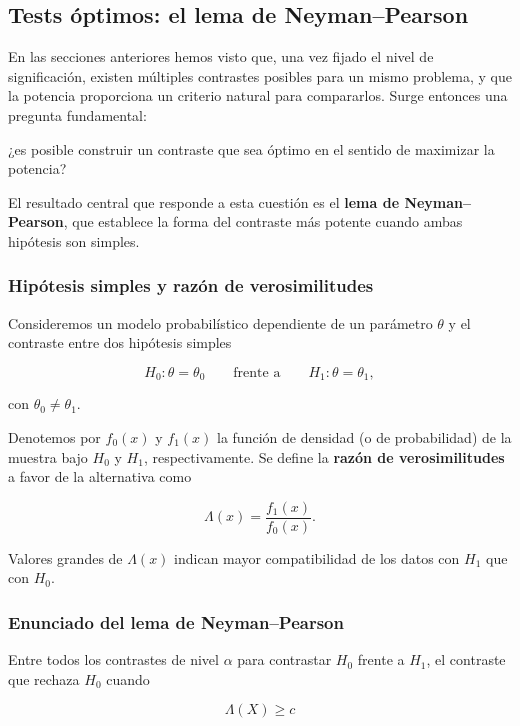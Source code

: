 \documentclass[
]{article}
\begin{document}
\subsection{Tests óptimos: el lema de Neyman--Pearson}\label{tests-uxf3ptimos-el-lema-de-neymanpearson}

En las secciones anteriores hemos visto que, una vez fijado el nivel de significación, existen múltiples contrastes posibles para un mismo problema, y que la potencia proporciona un criterio natural para compararlos. Surge entonces una pregunta fundamental:

¿es posible construir un contraste que sea óptimo en el sentido de maximizar la potencia?

El resultado central que responde a esta cuestión es el \textbf{lema de Neyman--Pearson}, que establece la forma del contraste más potente cuando ambas hipótesis son simples.

\subsubsection{Hipótesis simples y razón de verosimilitudes}\label{hipuxf3tesis-simples-y-razuxf3n-de-verosimilitudes}

Consideremos un modelo probabilístico dependiente de un parámetro \(\theta\) y el contraste entre dos hipótesis simples

\[
H_0:\theta=\theta_0
\qquad \text{frente a} \qquad
H_1:\theta=\theta_1,
\]

con \(\theta_0\neq\theta_1\).

Denotemos por \(f_0(x)\) y \(f_1(x)\) la función de densidad (o de probabilidad) de la muestra bajo \(H_0\) y \(H_1\), respectivamente. Se define la \textbf{razón de verosimilitudes} a favor de la alternativa como

\[
\Lambda(x)=\frac{f_1(x)}{f_0(x)}.
\]

Valores grandes de \(\Lambda(x)\) indican mayor compatibilidad de los datos con \(H_1\) que con \(H_0\).

\subsubsection{Enunciado del lema de Neyman--Pearson}\label{enunciado-del-lema-de-neymanpearson}

Entre todos los contrastes de nivel \(\alpha\) para contrastar \(H_0\) frente a \(H_1\), el contraste que rechaza \(H_0\) cuando

\[
\Lambda(X)\ge c
\]
\end{document}
